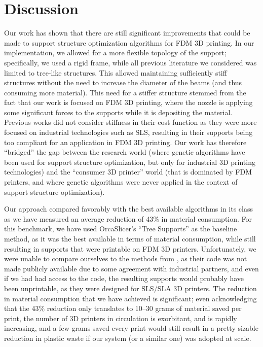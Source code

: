 \section{Discussion}

Our work has shown that there are still significant improvements that could be made 
to support structure optimization algorithms for FDM 3D printing. In our implementation,
we allowed for a more flexible topology of the support; specifically, we used a rigid frame,
while all previous literature we considered was limited to tree-like structures.
This allowed maintaining sufficiently stiff structures without the need to increase
the diameter of the beams (and thus consuming more material).
This need for a stiffer structure stemmed from the fact that our work is focused 
on FDM 3D printing, where the nozzle is applying some significant forces to the supports
while it is depositing the material.
Previous works \cite{ZHANG2020117,VAISSIER201911} did not consider
stiffness in their cost function as they were more focused on industrial technologies such as SLS, resulting
in their supports being too compliant for an application in FDM 3D printing.
Our work has therefore ``bridged'' the gap between the research world (where genetic algorithms
have been used for support structure optimization, but only for industrial 3D printing technologies)
and the ``consumer 3D printer'' world (that is dominated by FDM printers, and where genetic algorithms
were never applied in the context of support structure optimization).

Our approach compared favorably with the best available algorithms in its class 
as we have measured an average reduction of 43\% in material consumption.
For this benchmark, we have used OrcaSlicer's ``Tree Supports'' as the baseline method,
as it was the best available in terms of material consumption, while still
resulting in supports that were printable on FDM 3D printers.
Unfortunately, we were unable to compare ourselves to the methods from \cite{ZHANG2020117,VAISSIER201911},
as their code was not made publicly available due to some agreement with industrial partners,
and even if we had had access to the code, the resulting supports would probably have been
unprintable, as they were designed for SLS/SLA 3D printers.
The reduction in material consumption that we have achieved is significant;
even acknowledging that the 43\% reduction only translates to 10--30 grams
of material saved per print, the number of 3D printers in circulation is exorbitant,
and is rapidly increasing, and a few grams saved every print would still result in
a pretty sizable reduction in plastic waste if our system (or a similar one)
was adopted at scale.


